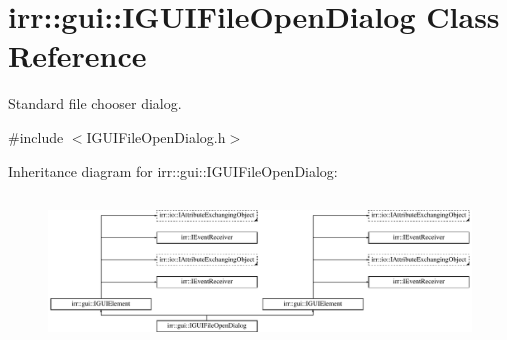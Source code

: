 \hypertarget{classirr_1_1gui_1_1IGUIFileOpenDialog}{}\section{irr\+:\+:gui\+:\+:I\+G\+U\+I\+File\+Open\+Dialog Class Reference}
\label{classirr_1_1gui_1_1IGUIFileOpenDialog}


Standard file chooser dialog.  




{\ttfamily \#include $<$I\+G\+U\+I\+File\+Open\+Dialog.\+h$>$}

Inheritance diagram for irr\+:\+:gui\+:\+:I\+G\+U\+I\+File\+Open\+Dialog\+:\begin{figure}[H]
\begin{center}
\leavevmode
\includegraphics[height=4.038462cm]{classirr_1_1gui_1_1IGUIFileOpenDialog}
\end{center}
\end{figure}
